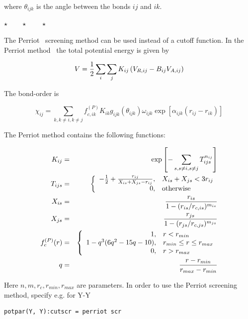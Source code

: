 \documentclass[a4paper,12pt,pdftex,onecolumn]{article}
\newcommand{\stars}{\begin{center}%
\vspace{1em plus 0.5em minus 0.5em}%
$\star \qquad \star \qquad \star$%
\vspace{1em plus 0.5em minus 0.5em}%
\end{center}}
\begin{document}
where $\theta_{ijk}$ is the angle between the bonds $ij$ and $ik$.

\stars

The Perriot~\cite{Perriot-2013} screening method can be used instead of
a cutoff function. In the Perriot method~\cite{Perriot-2013}
the total potential energy is given by

\begin{equation}
V = {1 \over 2} \sum_i \sum_{j} K_{ij} \left( V_{R,ij} - B_{ij} V_{A,ij} \right)
\label{eq:abop-perriot}
\end{equation}

The bond-order is

\begin{equation}
\chi_{ij} =
\sum_{k, k \neq i, k \neq j} f^{(P)}_{c,ik} K_{ik} g_{ijk}(\theta_{ijk})
\omega_{ijk} \exp\left[ \alpha_{ijk}(r_{ij} - r_{ik}) \right]
\end{equation}

The Perriot method contains the following functions:

\begin{eqnarray}
K_{ij} &=& \exp\left[ - \sum_{s, s\neq i, s\neq j} T_{ijs}^{n_{ij}} \right] \\
T_{ijs} &=&
\left\{
\begin{array}{rl}
-{1\over 2} + {r_{ij} \over X_{is} + X_{js} - r_{ij}}, & X_{is}+X_{js} < 3 r_{ij}\\
0, & \mathrm{otherwise}
\end{array}
\right.
\\
X_{is} &=& {r_{is} \over 1 - (r_{is}/r_{c,is})^{m_{is}}} \\
X_{js} &=& {r_{js} \over 1 - (r_{js}/r_{c,js})^{m_{js}}} \\
f^{(P)}_c(r) &=& \left\{
\begin{array}{rl}
1, &  r < r_{min} \\
1 - q^3 (6 q^2 - 15 q - 10), & r_{min} \leq r \leq r_{max} \\
0, & r > r_{max}
\end{array}
\right.
\\
q &=& {r - r_{min} \over r_{max} - r_{min}}
\end{eqnarray}

Here $n,m,r_c,r_{min},r_{max}$ are parameters.
In order to use the Perriot screening method, specify e.g. for Y-Y

\begin{Verbatim}[fontsize=\relsize{-1},frame=single]
  potpar(Y, Y):cutscr = perriot scr
\end{Verbatim}
\end{document}
